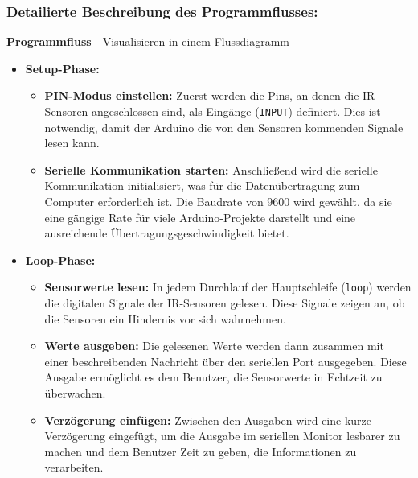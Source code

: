 \documentclass{vorlage-design-main}
\begin{document}
\hypertarget{detailierte-beschreibung-des-programmflusses}{%
\subsubsection{Detailierte Beschreibung des
Programmflusses:}\label{detailierte-beschreibung-des-programmflusses}}

\textbf{Programmfluss} - Visualisieren in einem Flussdiagramm

\begin{itemize}

\item
  \textbf{Setup-Phase:}

  \begin{itemize}
  
  \item
    \textbf{PIN-Modus einstellen:} Zuerst werden die Pins, an denen die
    IR-Sensoren angeschlossen sind, als Eingänge
    (\verb|INPUT|) definiert. Dies ist notwendig,
    damit der Arduino die von den Sensoren kommenden Signale lesen kann.
  \item
    \textbf{Serielle Kommunikation starten:} Anschließend wird die
    serielle Kommunikation initialisiert, was für die Datenübertragung
    zum Computer erforderlich ist. Die Baudrate von 9600 wird gewählt,
    da sie eine gängige Rate für viele Arduino-Projekte darstellt und
    eine ausreichende Übertragungsgeschwindigkeit bietet.
  \end{itemize}
\item
  \textbf{Loop-Phase:}

  \begin{itemize}
  
  \item
    \textbf{Sensorwerte lesen:} In jedem Durchlauf der Hauptschleife
    (\verb|loop|) werden die digitalen Signale der
    IR-Sensoren gelesen. Diese Signale zeigen an, ob die Sensoren ein
    Hindernis vor sich wahrnehmen.
  \item
    \textbf{Werte ausgeben:} Die gelesenen Werte werden dann zusammen
    mit einer beschreibenden Nachricht über den seriellen Port
    ausgegeben. Diese Ausgabe ermöglicht es dem Benutzer, die
    Sensorwerte in Echtzeit zu überwachen.
  \item
    \textbf{Verzögerung einfügen:} Zwischen den Ausgaben wird eine kurze
    Verzögerung eingefügt, um die Ausgabe im seriellen Monitor lesbarer
    zu machen und dem Benutzer Zeit zu geben, die Informationen zu
    verarbeiten.
  \end{itemize}
\end{itemize}
\end{document}
